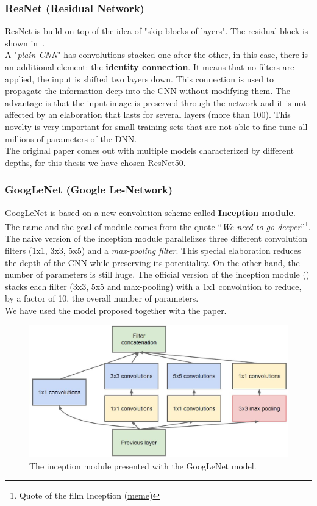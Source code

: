 \subsubsection*{ResNet (Residual Network)}
ResNet\cite{resNet_paper} is build on top of the idea of "skip blocks of layers". The residual block is shown in~.\\
A "\textit{plain CNN}" has convolutions stacked one after the other, in this case, there is an additional element: the \textbf{identity connection}. It means that no filters are applied, the input is shifted two layers down. This connection is used to propagate the information deep into the CNN without modifying them. The advantage is that the input image is preserved through the network and it is not affected by an elaboration that lasts for several layers (more than 100). This novelty is very important for small training sets that are not able to fine-tune all millions of parameters of the DNN.\\
The original paper comes out with multiple models characterized by different depths, for this thesis we have chosen ResNet50\cite{resNet_model}.

\subsubsection*{GoogLeNet (Google Le-Network)}
GoogLeNet\cite{googLeNet_paper} is based on a new convolution scheme called \textbf{Inception module}. The name and the goal of module comes from the quote “\textit{We need to go deeper}”\footnote{Quote of the film Inception (\href{https://i.kym-cdn.com/photos/images/newsfeed/000/531/557/a88.jpg}{meme})}.\\
The naive version of the inception module parallelizes three different convolution filters (1x1, 3x3, 5x5) and a \textit{max-pooling filter}. This special elaboration reduces the depth of the CNN while preserving its potentiality. On the other hand, the number of parameters is still huge. The official version of the inception module () stacks each filter (3x3, 5x5 and max-pooling) with a 1x1 convolution to reduce, by a factor of 10, the overall number of parameters.\\
We have used the model\cite{googleNet_model} proposed together with the paper.
\begin{figure}[!h]
	\centering
	\includegraphics[width=0.8\linewidth]{images/recognition/howItWorks_inceptionModule}
	\captionsetup{margin=0.5cm}
	\caption{The inception module presented with the GoogLeNet model.}
	\label{fig:howItWorks_inceptionModule}
\end{figure}

